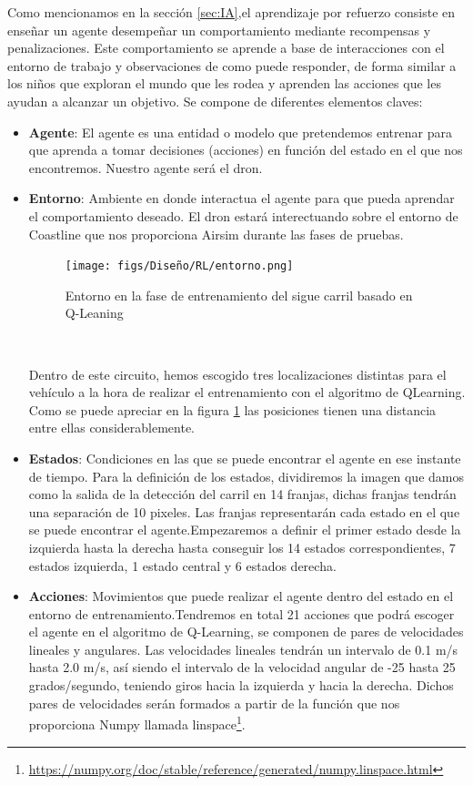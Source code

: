   Como mencionamos en la sección \ref{sec:IA},el aprendizaje por refuerzo consiste en enseñar un agente 
  desempeñar un comportamiento mediante recompensas y penalizaciones. Este comportamiento se aprende a base de interacciones con el entorno de trabajo y observaciones de como puede responder,
  de forma similar a los niños que exploran el mundo que les rodea y aprenden las acciones que les ayudan a alcanzar un objetivo. Se compone de diferentes elementos claves:
  \begin{itemize} 
    \item \textbf{Agente}: El agente es una entidad o modelo que pretendemos entrenar para que aprenda a tomar decisiones (acciones) en función del estado en el que nos encontremos. Nuestro 
    agente será el dron.
    \item \textbf{Entorno}: Ambiente en donde interactua el agente para que pueda aprendar el comportamiento deseado. El dron estará interectuando sobre el entorno de Coastline que nos proporciona Airsim 
    durante las fases de pruebas. 
    \begin{figure} [H]
      \begin{center}
        \texttt{[image: figs/Diseño/RL/entorno.png]}
      \end{center}
      \caption{Entorno en la fase de entrenamiento del sigue carril basado en Q-Leaning}
      \label{fig:Entorno}
    \end{figure}\

    Dentro de este circuito, hemos escogido tres localizaciones distintas para el vehículo a la hora de realizar el entrenamiento con el algoritmo de QLearning. Como se puede apreciar en la figura \ref{fig:Entorno} las posiciones
    tienen una distancia entre ellas considerablemente. 
    \item \textbf{Estados}: Condiciones en las que se puede encontrar el agente en ese instante de tiempo. Para la definición de los estados, dividiremos la imagen que damos como la salida de la detección del carril en 14 franjas, dichas franjas tendrán una 
    separación de 10 pixeles. Las franjas representarán cada estado en el que se puede encontrar el agente.Empezaremos a definir el primer estado desde la izquierda hasta la derecha
    hasta conseguir los 14 estados correspondientes, 7 estados izquierda, 1 estado central y 6 estados derecha. 
    \item \textbf{Acciones}: Movimientos que puede realizar el agente dentro del estado en el entorno de entrenamiento.Tendremos en total 21 acciones que podrá escoger el agente en el algoritmo de Q-Learning, se componen de pares de velocidades lineales y angulares. Las velocidades lineales
    tendrán un intervalo de 0.1 m/s hasta 2.0 m/s, así siendo el intervalo de la velocidad angular de -25 hasta 25 grados/segundo, teniendo giros hacia la izquierda y hacia la derecha. Dichos pares
    de velocidades serán formados a partir de la función que nos proporciona Numpy llamada linspace\footnote{\url{https://numpy.org/doc/stable/reference/generated/numpy.linspace.html}}. \newline
  

\end{itemize}

